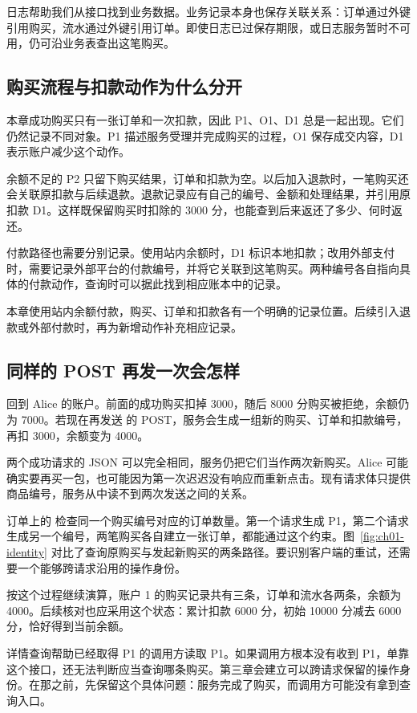 日志帮助我们从接口找到业务数据。业务记录本身也保存关联关系：订单通过外键引用购买，流水通过外键引用订单。即使日志已过保存期限，或日志服务暂时不可用，仍可沿业务表查出这笔购买。

\subsection*{购买流程与扣款动作为什么分开}

本章成功购买只有一张订单和一次扣款，因此 P1、O1、D1 总是一起出现。它们仍然记录不同对象。P1 描述服务受理并完成购买的过程，O1 保存成交内容，D1 表示账户减少这个动作。

余额不足的 P2 只留下购买结果，订单和扣款为空。以后加入退款时，一笔购买还会关联原扣款与后续退款。退款记录应有自己的编号、金额和处理结果，并引用原扣款 D1。这样既保留购买时扣除的 3000 分，也能查到后来返还了多少、何时返还。

付款路径也需要分别记录。使用站内余额时，D1 标识本地扣款；改用外部支付时，需要记录外部平台的付款编号，并将它关联到这笔购买。两种编号各自指向具体的付款动作，查询时可以据此找到相应账本中的记录。

本章使用站内余额付款，购买、订单和扣款各有一个明确的记录位置。后续引入退款或外部付款时，再为新增动作补充相应记录。

\subsection*{同样的 POST 再发一次会怎样}

回到 Alice 的账户。前面的成功购买扣掉 3000，随后 8000 分购买被拒绝，余额仍为 7000。若现在再发送  的 POST，服务会生成一组新的购买、订单和扣款编号，再扣 3000，余额变为 4000。

两个成功请求的 JSON 可以完全相同，服务仍把它们当作两次新购买。Alice 可能确实要再买一包，也可能因为第一次迟迟没有响应而重新点击。现有请求体只提供商品编号，服务从中读不到两次发送之间的关系。

订单上的  检查同一个购买编号对应的订单数量。第一个请求生成 P1，第二个请求生成另一个编号，两笔购买各自建立一张订单，都能通过这个约束。图~\ref{fig:ch01-identity} 对比了查询原购买与发起新购买的两条路径。要识别客户端的重试，还需要一个能够跨请求沿用的操作身份。



按这个过程继续演算，账户 1 的购买记录共有三条，订单和流水各两条，余额为 4000。后续核对也应采用这个状态：累计扣款 6000 分，初始 10000 分减去 6000 分，恰好得到当前余额。

详情查询帮助已经取得 P1 的调用方读取 P1。如果调用方根本没有收到 P1，单靠这个接口，还无法判断应当查询哪条购买。第三章会建立可以跨请求保留的操作身份。在那之前，先保留这个具体问题：服务完成了购买，而调用方可能没有拿到查询入口。
